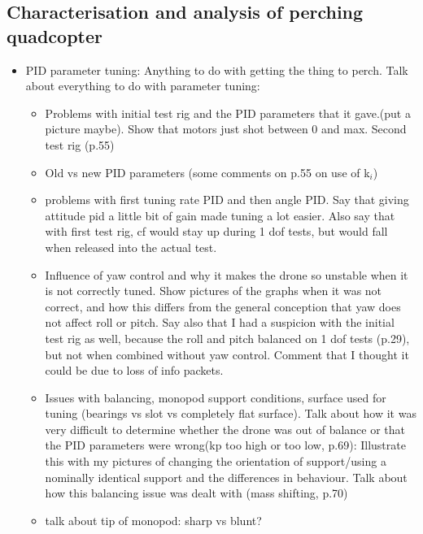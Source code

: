 \documentclass[12pt,a4paper]{article}
\begin{document}
\subsection{Characterisation and analysis of perching quadcopter}
\begin{itemize}
\item PID parameter tuning: Anything to do with getting the thing to perch. Talk about everything to do with parameter tuning:
\begin{itemize}
\item Problems with initial test rig and the PID parameters that it gave.(put a picture maybe). Show that motors just shot between 0 and max. Second test rig (p.55)
\item Old vs new PID parameters (some comments on p.55 on use of k$_i$)
\item problems with first tuning rate PID and then angle PID. Say that giving attitude pid a little bit of gain made tuning a lot easier. Also say that with first test rig, cf would stay up during 1 dof tests, but would fall when released into the actual test.
\item Influence of yaw control and why it makes the drone so unstable when it is not correctly tuned. Show pictures of the graphs when it was not correct, and how this differs from the general conception that yaw does not affect roll or pitch. Say also that I had a suspicion with the initial test rig as well, because the roll and pitch balanced on 1 dof tests (p.29), but not when combined without yaw control. Comment that I thought it could be due to loss of info packets.
\item Issues with balancing, monopod support conditions, surface used for tuning (bearings vs slot vs completely flat surface). Talk about how it was very difficult to determine whether the drone was out of balance or that the PID parameters were wrong(kp too high or too low, p.69): Illustrate this with my pictures of changing the orientation of support/using a nominally identical support and the differences in behaviour. Talk about how this balancing issue was dealt with (mass shifting, p.70)
\item talk about tip of monopod: sharp vs blunt?


\end{itemize}
\end{itemize}
\end{document}
